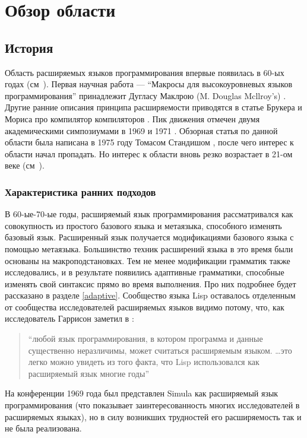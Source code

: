 \documentclass[a4paper,12pt,titlepage]{extarticle}
\begin{document}
\section{Обзор области}

\subsection{История}
\label{hist}
Область расширяемых языков программирования впервые появилась в 60-ых годах
(см~\cite{hist69}). Первая научная работа --- ``Макросы для высокоуровневых
языков программирования'' принадлежит Дугласу Маклрою (M. Douglas Mcllroy's)
\cite{macro60}. Другие ранние описания принципа расширяемости приводятся в
статье Брукера и Мориса про компилятор компиляторов \cite{cc60}.
Пик движения отмечен двумя академическими симпозиумами в 1969 \cite{proc69} и 1971
\cite{proc71}. Обзорная статья по данной области была написана в 1975 году
Томасом Стандишом \cite{Stan75}, после чего интерес к области начал пропадать.
Но интерес к области вновь резко возрастает в 21-ом веке (см~\cite{Ext2105}).

\subsubsection*{Характеристика ранних подходов}

В 60-ые-70-ые годы, расширяемый язык программирования рассматривался
как совокупность из простого базового языка и метаязыка, способного изменять
базовый язык. Расширенный язык получается модификациями базового языка с помощью метаязыка. Большинство техник расширений
языка в это время были основаны на макроподстановках. Тем не менее модификации
грамматик также исследовались, и в результате появились адаптивные грамматики, способные
изменять свой синтаксис прямо во время выполнения. Про них подробнее будет 
рассказано в разделе \ref{adaptive}. Сообщество языка Lisp оставалось отделенным
от сообщества исследователей расширяемых языков видимо потому, что, как 
исследователь Гаррисон заметил в \cite{harr60}:
\begin{quote}
``любой язык программирования, в котором программа и данные существенно
неразличимы, может считаться расширяемым языком. \ldots это легко можно увидеть
из того факта, что Lisp использовался как расширяемый язык многие годы''
\end{quote}
На конференции 1969 года был представлен Simula как расширяемый язык
программирования (что показывает заинтересованность многих исследователей в
расширяемых языках), но в силу возникших трудностей его расширяемость так и
не была реализована.
\end{document}
